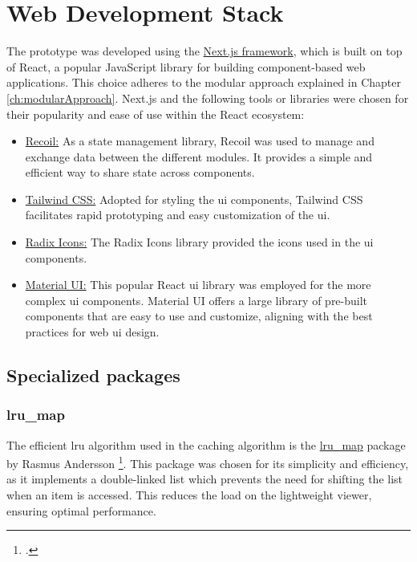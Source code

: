 \section{Web Development Stack}
The prototype was developed using the \href{https://nextjs.org/}{Next.js framework}, which is built on top of React, a popular JavaScript library for building component-based web applications. This choice adheres to the modular approach explained in Chapter \ref{ch:modularApproach}. Next.js and the following tools or libraries were chosen for their popularity and ease of use within the React ecosystem:

\begin{itemize}
    \item \href{https://recoiljs.org/}{Recoil:} As a state management library, Recoil was used to manage and exchange data between the different modules. It provides a simple and efficient way to share state across components.

    \item \href{https://tailwindcss.com/}{Tailwind CSS:} Adopted for styling the \ac{ui} components, Tailwind CSS facilitates rapid prototyping and easy customization of the \ac{ui}.

    \item \href{https://icons.radix-ui.com/}{Radix Icons:} The Radix Icons library provided the icons used in the \ac{ui} components.

    \item \href{https://mui.com/}{Material UI:} This popular React \ac{ui} library was employed for the more complex \ac{ui} components. Material UI offers a large library of pre-built components that are easy to use and customize, aligning with the best practices for web \ac{ui} design.
\end{itemize}

\subsection{Specialized packages}
\subsubsection{lru\_map}
The efficient \ac{lru} algorithm used in the caching algorithm is the \href{https://github.com/rsms/js-lru}{lru\_map} package by Rasmus Andersson \footcite{rsms}. This package was chosen for its simplicity and efficiency, as it implements a double-linked list which prevents the need for shifting the list when an item is accessed. This reduces the load on the lightweight viewer, ensuring optimal performance.

